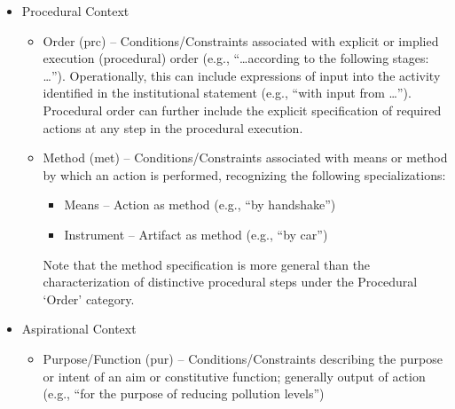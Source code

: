 \begin{itemize}
\item[] Procedural Context

\begin{itemize}
\item Order (prc) -- Conditions/Constraints associated with explicit or implied execution (procedural) order (e.g., ``\dots according to the following stages: \dots''). Operationally, this can include expressions of input into the activity identified in the institutional statement (e.g., ``with input from \dots''). Procedural order can further include the explicit specification of required actions at any step in the procedural execution. %

\item Method (met) -- Conditions/Constraints associated with means or method by which an action is performed, recognizing the following specializations:
	\begin{itemize}
	\item Means -- Action as method (e.g., ``by handshake'')
	\item Instrument -- Artifact as method (e.g., ``by car'')
	\end{itemize}
Note that the method specification is more general than the characterization of distinctive procedural steps under the Procedural `Order' category.
\end{itemize}
\end{itemize}

\begin{itemize}
\item[] Aspirational Context

\begin{itemize}
\item Purpose/Function (pur) -- Conditions/Constraints describing the purpose or intent of an aim or constitutive function; generally output of action (e.g., ``for the purpose of reducing pollution levels'')
\end{itemize}
\end{itemize}

